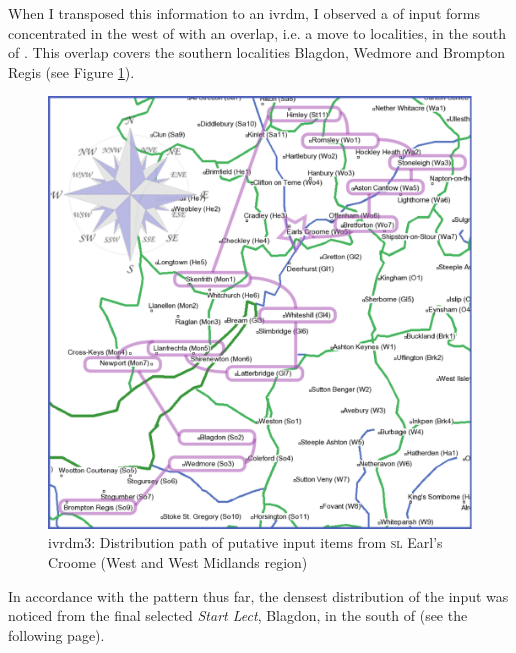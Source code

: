 When I transposed this information to an ivrdm, I observed a  of input forms concentrated in the west of  with an overlap, i.e. a move to localities, in the south of . This overlap covers the southern localities Blagdon, Wedmore and Brompton Regis (see Figure \ref{Map5.7b}).
 

\begin{figure}
\includegraphics[width=\textwidth,] {figures/ivrdm3.pdf}
\addtocounter{figure}{-1}\renewcommand{\thefigure}{\arabic{figure}.7b}
\caption {ivrdm3: Distribution path of putative input items from \textsc{sl} Earl's Croome (West and West Midlands region)} 
\label{Map5.7b}
\end{figure}

In accordance with the pattern thus far, the densest distribution of the input was noticed from the final selected \emph{Start Lect}, Blagdon, in the south of  (see the following page).
 

